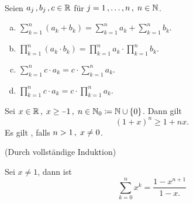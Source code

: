 \documentclass[../ana1.tex]{subfiles}
\begin{document}
\begin{bem}\leavevmode\\
	Seien \(a_{j} \operatorname{,} b_{j} \operatorname{,} c \in \mathbb{R}\) für \(j = 1 \operatorname{,} \ldots \operatorname{,} n \operatorname{,} \; n \in \mathbb{N}\).
	\begin{enumerate}[(a)]
		\item \(\sum_{k = 1}^{n} (a_{k} + b_{k}) = \sum_{k = 1}^{n} a_{k} + \sum_{k = 1}^{n} b_{k}.\)
		\item \(\prod_{k = 1}^{n} (a_{k} \cdot b_{k}) = \prod_{k = 1}^{n} a_{k} \cdot \prod_{k = 1}^{n} b_{k}.\)
		\item \(\sum_{k = 1}^{n} c \cdot a_{k} = c \cdot \sum_{k = 1}^{n} a_{k}.\)
		\item \(\prod_{k = 1}^{n} c \cdot a_{k} = c \cdot \prod_{k = 1}^{n} a_{k}.\)
	\end{enumerate}
\end{bem}

\begin{satz}\label{satz:bern_ungl}
	Sei \(x \in \R \ko \; x \geq \minus 1 \ko \; n \in \N_{0} \coloneqq \N \cup \set{0}\). Dann gilt
	\[{(1 + x)}^{n} \geq 1 + nx.\]
	Es gilt \gqq{\(>\)}, falls \(n>1 \operatorname{,} \; x \neq 0\).
\end{satz}
\begin{bew} (Durch vollständige Induktion)
\end{bew}

\begin{satz}\label{satz:geom_sum}
	Sei \(x\neq 1\), dann ist 
	\[\sum_{k = 0}^{n}{x}^{k} = \frac{1 - x^{n + 1}}{1 - x.}\]
\end{satz}

\iftoggle{short}{}{\newpage}%
\end{document}
